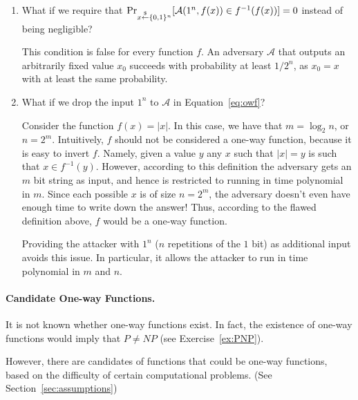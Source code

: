 \begin{enumerate}
\item What if we require that
    $\Pr_{x \stackrel{\$}{\leftarrow} \{0,1\}^{n}}[ \mathcal{A}(1^n, f(x)) \in f^{-1}(f(x))] = 0$ instead of being negligible?

This condition is false for every function $f$. An adversary $\mathcal{A}$ that outputs an arbitrarily fixed value $x_0$ succeeds with probability at least $1/2^{n}$, as $x_0 = x$ with at least the same probability.

\item  What if we drop the input $1^n$ to $\mathcal{A}$ in Equation~\ref{eq:owf}?

Consider the function $f(x) = |x|$.  In this case, we have that $m = \log_2 n$, or $n = 2^m$.  Intuitively, $f$ should not be considered a one-way function, because it is easy to invert $f$. Namely, given a value $y$ any $x$ such that $|x| = y$ is such that $x \in f^{-1}(y)$.  However, according to this definition the adversary gets an $m$ bit string as input, and hence is restricted to running in time polynomial in $m$. Since each possible $x$ is of size $n = 2^m$, the adversary doesn't even have enough time to write down the answer!  Thus, according to the flawed definition above, $f$ would be a one-way function.

Providing the attacker with $1^n$ ($n$ repetitions of the $1$ bit) as additional input avoids this issue.  In particular, it allows the attacker to run in time polynomial in $m$ and $n$.
\end{enumerate}

\paragraph{Candidate One-way Functions.}
It is not known whether one-way functions exist. In fact, the existence of one-way functions would imply that $P \neq NP$ (see Exercise~\ref{ex:PNP}). 

However, there are candidates of functions that could be one-way functions, based on the difficulty of certain computational problems. (See Section~\ref{sec:assumptions})%
%

